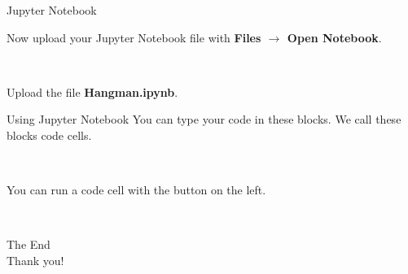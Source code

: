 \documentclass[dvipsnames, svgnames, x11names]{beamer}
\begin{document}
\begin{frame}[fragile]{Jupyter Notebook}
    \begin{center}
        Now upload your Jupyter Notebook file with \textbf{Files $\rightarrow$ Open Notebook}.
    
        \


        Upload the file \textbf{Hangman.ipynb}.
    
    \end{center}
\end{frame}

\begin{frame}[fragile]{Using Jupyter Notebook}
    You can type your code in these blocks. We call these blocks code cells.

    \begin{center}
    \end{center}

    \

    You can run a code cell with the button on the left.

    \begin{center}
    \end{center}
\end{frame}

\begin{frame}{ \ }
	\begin{center}
		The End\\
		Thank you!
	\end{center}
\end{frame}
\end{document}
